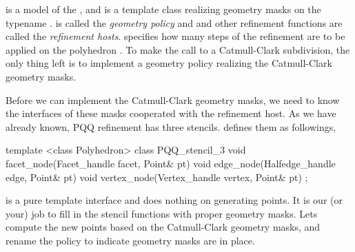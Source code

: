  is a model of the , and
 is a template class realizing geometry masks on the typename 
.  is called the
\emph{geometry policy} and  and other refinement 
functions are called the \emph{refinement hosts}. 
 specifies how many steps of the 
refinement are to be applied on the polyhedron . To make the call to
 a Catmull-Clark subdivision, the only thing left is to
implement a geometry policy realizing the Catmull-Clark geometry masks.

Before we can implement the Catmull-Clark geometry masks, we 
need to know the interfaces of these masks cooperated with
the refinement host. As we have already known, PQQ refinement has three
stencils.  defines them as followings,
\begin{ccExampleCode}
template <class Polyhedron>
class PQQ_stencil_3 {
  void facet_node(Facet_handle facet, Point& pt) {}
  void edge_node(Halfedge_handle edge, Point& pt) {}
  void vertex_node(Vertex_handle vertex, Point& pt) {}
};
\end{ccExampleCode}

 is a pure template interface and does nothing 
on generating points. It is our (or your) job to fill in the 
stencil functions with proper geometry masks. Lets compute the 
new points based on the Catmull-Clark geometry masks, and 
rename the policy to indicate geometry masks are in place.

